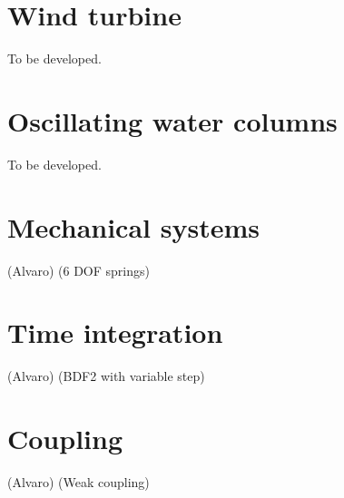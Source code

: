 \documentclass[10pt] {article}
\begin{document}
\clearpage
\section{Wind turbine}
To be developed.


\section{Oscillating water columns}
To be developed.


\section{Mechanical systems}
(Alvaro) (6 DOF springs)


\section{Time integration}
(Alvaro) (BDF2 with variable step)


\section{Coupling}
(Alvaro) (Weak coupling)



\clearpage
\end{document}
